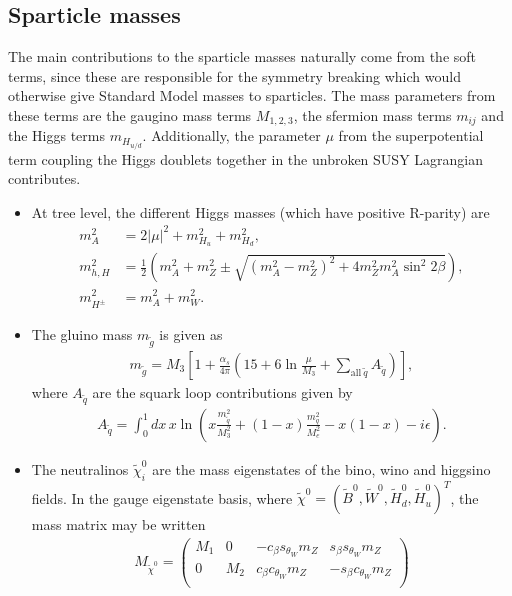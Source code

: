 \documentclass[twoside,english]{uiofysmaster}
\begin{document}
 \subsection{Sparticle masses}
 The main contributions to the sparticle masses naturally come from the soft terms, since these are responsible for the symmetry breaking which would otherwise give Standard Model masses to sparticles. The mass parameters from these terms are the gaugino mass terms $M_{1,2,3}$, the sfermion mass terms $m_{ij}$ and the Higgs terms $m_{H_{u/d}}$. Additionally, the parameter $\mu$ from the superpotential term coupling the Higgs doublets together in the unbroken SUSY Lagrangian contributes.
 \begin{itemize}
 	\item At tree level, the different Higgs masses (which have positive R-parity) are
 	\begin{align}
 		m_A^2 &= 2|\mu|^2 + m^2_{H_u} + m^2_{H_d},\label{eq:mssm_higgs_masses1}\\
 		m^2_{h,H} &= \frac{1}{2} \left( m_A^2 + m_Z^2 \pm \sqrt{(m_A^2 - m_Z^2)^2 + 4m_Z^2m_A^2\sin^2 2\beta} \right),\label{eq:mssm_higgs_masses2}\\
 		m^2_{H^\pm} &= m_A^2 + m_W^2.
 	\end{align}
 	\item The gluino mass $m_{\tilde g}$ is given as
 	\begin{align}
 		m_{\tilde g} = M_3 \left[ 1 + \frac{\alpha_s}{4\pi}\left( 15 + 6\ln\frac{\mu}{M_3} + \sum_{\mathrm{all} ~\tilde q} A_{\tilde q} \right)\right],
 	\end{align}
 	where $A_{\tilde q}$ are the squark loop contributions given by
 	\begin{align}
 		A_{\tilde q} = \int_0^1 dx \, x \ln\left( x \frac{m^2_{\tilde q}}{M_3^2} + (1-x)\frac{m_q^2}{M_e^2} - x(1-x) - i\epsilon \right).
 	\end{align}%
 	\item The neutralinos $\tilde\chi_i^0$ are the mass eigenstates of the bino, wino and higgsino fields. In the gauge eigenstate basis, where $\tilde\chi^{0} = (\tilde B^0, \tilde W^0, \tilde H_d^0, \tilde H_u^0)^T$, the mass matrix may be written
 	\begin{align}
 		M_{\tilde \chi^0} = \begin{pmatrix}
 			M_1 & 0 & - c_\beta s_{\theta_W} m_Z &  s_\beta s_{\theta_W} m_Z \\
 			0 & M_2 &  c_\beta c_{\theta_W} m_Z & - s_\beta c_{\theta_W} m_Z\\

\end{pmatrix}
\end{align}
\end{itemize}
\end{document}
